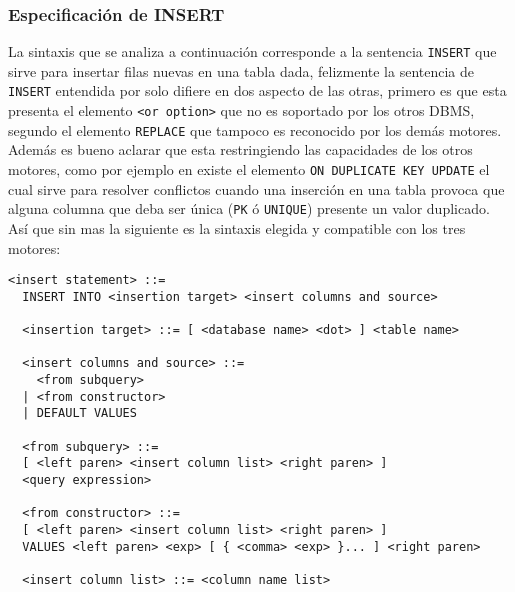 \subsubsection{Especificación de INSERT} 
\label{especificacion:dialectos:insert}
La sintaxis que se analiza a continuación corresponde a la sentencia \verb=INSERT= que sirve para insertar filas nuevas en una tabla dada, felizmente la sentencia de \verb=INSERT= entendida por \s solo difiere en dos aspecto de las otras, primero es que esta presenta el elemento \verb=<or option>= que no es soportado por los otros DBMS, segundo el elemento \verb=REPLACE= que tampoco es reconocido por los demás motores. Además es bueno aclarar que \s esta restringiendo las capacidades de los otros motores, como por ejemplo en \m existe el elemento \verb=ON DUPLICATE KEY UPDATE= el cual sirve para resolver conflictos cuando una inserción en una tabla provoca que alguna columna que deba ser única (\verb=PK= ó \verb=UNIQUE=) presente un valor duplicado. Así que sin mas la siguiente es la sintaxis elegida y compatible con los tres motores:
%
\begin{Verbatim}[frame=single, label=sintaxis para INSERT]
  <insert statement> ::=
  INSERT INTO <insertion target> <insert columns and source>

  <insertion target> ::= [ <database name> <dot> ] <table name>

  <insert columns and source> ::=
    <from subquery>
  | <from constructor>
  | DEFAULT VALUES

  <from subquery> ::=
  [ <left paren> <insert column list> <right paren> ]
  <query expression>
  
  <from constructor> ::=
  [ <left paren> <insert column list> <right paren> ]
  VALUES <left paren> <exp> [ { <comma> <exp> }... ] <right paren>

  <insert column list> ::= <column name list>
\end{Verbatim}
%
%
%
%
